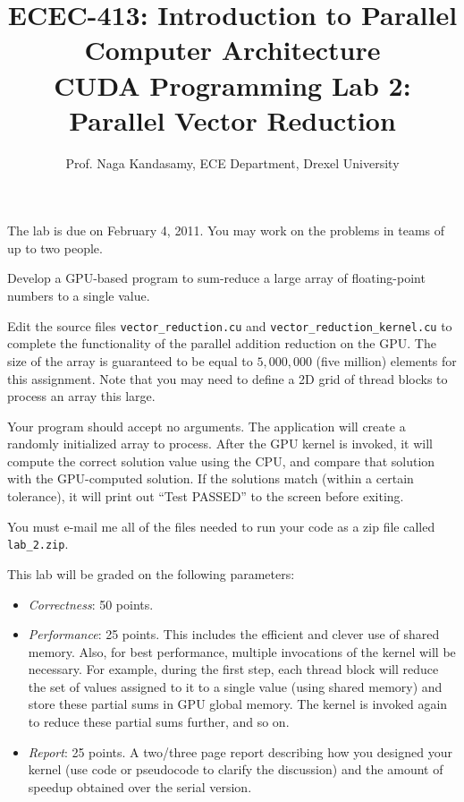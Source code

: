\documentclass[12.0pt]{article}
\begin{document}
\title{ECEC-413: Introduction to Parallel Computer Architecture \\
CUDA Programming Lab 2: Parallel Vector Reduction}
\author{Prof. Naga Kandasamy, ECE Department, Drexel University}
\maketitle %
\date{}

\noindent The lab is due on February 4, 2011. You may work on the problems in teams of up to two people.
\vspace{12pt}

\noindent Develop a GPU-based program to sum-reduce a large array of floating-point numbers to a single value. \vspace{12pt}

\noindent Edit the source files \texttt{vector\_reduction.cu} and \texttt{vector\_reduction\_kernel.cu} to complete the functionality of the parallel addition reduction on the GPU.  The size of the array is guaranteed to be equal to $5,000,000$ (five million) elements for this assignment. Note that you may need to define a 2D grid of thread blocks to process an array this large. \vspace{12pt}

\noindent Your program should accept no arguments. The application will create a randomly initialized array to
    process. After the GPU kernel is invoked, it will compute the correct solution value using the CPU, and compare that solution with the GPU-computed solution.  If the solutions match (within a certain tolerance), it will print out ``Test PASSED'' to the screen before exiting. \vspace{12pt}

\noindent You must e-mail me all of the files needed to run your code as a zip file called \texttt{lab\_2.zip}. \vspace{12pt}

\noindent This lab will be graded on the following parameters:
\begin{itemize}
\item \emph{Correctness}: 50 points.

\item \emph{Performance}: 25 points. This includes the efficient and clever use of shared memory. Also, for best performance, multiple invocations of the kernel will be necessary. For example, during the first step, each thread block will reduce the set of values assigned to it to a single value (using shared memory) and store these partial sums in GPU global memory. The kernel is invoked again to reduce these partial sums further, and so on.

\item \emph{Report}: 25 points. A two/three page report describing how you designed your kernel (use code or pseudocode to clarify the discussion) and the amount of speedup obtained over the serial version.
\end{itemize}
\end{document}
